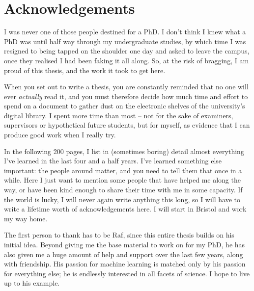 \chapter*{Acknowledgements}

I was never one of those people destined for a PhD.
I don't think I knew what a PhD was until half way through my undergraduate studies, 
    by which time I was resigned to being tapped on the shoulder one day and asked to leave the campus, 
    once they realised I had been faking it all along. 
So, at the risk of bragging, I am proud of this thesis, 
    and the work it took to get here. 
\par
When you set out to write a thesis, 
    you are constantly reminded that no one will ever \emph{actually} read it, 
    and you must therefore decide how much time and effort to spend on a document to 
    gather dust on the electronic shelves of the university's digital library. 
I spent more time than most -- 
    not for the sake of examiners, supervisors or hypothetical future students, 
    but for myself, as evidence that I can produce good work when I really try. 
\par 

In the following 200 pages, I list in (sometimes boring) detail almost everything I've learned 
    in the last four and a half years. 
I've learned something else important: 
    the people around matter, and you need to tell them that once in a while.
Here I just want to mention some people that have helped me along the way, 
    or have been kind enough to share their time with me in some capacity. 
If the world is lucky, I will never again write anything this long, 
    so I will have to write a lifetime worth of acknowledgements here. 
I will start in Bristol and work my way home. 

The first person to thank has to be Raf, since this entire thesis builds on his initial idea.
Beyond giving me the base material to work on for my PhD, 
    he has also given me a huge amount of help and support over the last few years, 
    along with friendship. 
His passion for machine learning is matched only by his passion for everything else; 
    he is endlessly interested in all facets of science. 
I hope to live up to his example. 
\par 

